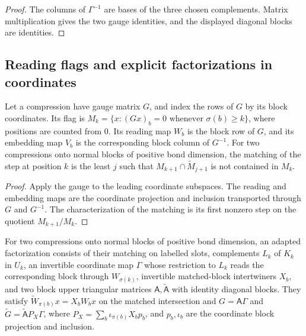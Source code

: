\begin{proof}
    \leanok
    The columns of $\Gamma^{-1}$ are bases of the three chosen complements.
    Matrix multiplication gives the two gauge identities, and the displayed
    diagonal blocks are identities.
\end{proof}

\subsection{Reading flags and explicit factorizations in coordinates}

\begin{lemma}
    \label{lem:asym_example_flag_coordinates}
    \leanok
    Let a compression have gauge matrix $G$, and index the rows of $G$ by
    its block coordinates. Its flag is
    $M_k=\{x:(Gx)_b=0\text{ whenever }\sigma(b)\geq k\}$, where positions
    are counted from $0$. Its reading map $W_b$ is the block row of $G$,
    and its embedding map $V_b$ is the corresponding block column of $G^{-1}$.
    For two compressions onto normal blocks of positive bond dimension,
    the matching of the step at position $k$ is the least $j$ such that
    $M_{k+1}\cap\widetilde M_{j+1}$ is not contained in $M_k$.
\end{lemma}

\begin{proof}
    \leanok
    Apply the gauge to the leading coordinate subspaces. The reading and
    embedding maps are the coordinate projection and inclusion transported
    through $G$ and $G^{-1}$. The characterization of the matching is its
    first nonzero step on the quotient $M_{k+1}/M_k$.
\end{proof}

\begin{definition}
    \label{def:asym_example_adapted_factorization}
    \leanok
    For two compressions onto normal blocks of positive bond dimension,
    an adapted factorization consists of their matching on labelled slots,
    complements $L_k$ of $K_k$ in $U_k$, an invertible coordinate map
    $\Gamma$ whose restriction to $L_k$ reads the corresponding block through
    $W_{\sigma(k)}$, invertible matched-block intertwiners $X_b$, and two
    block upper triangular matrices $\mathsf A,\widetilde{\mathsf A}$ with
    identity diagonal blocks. They satisfy
    $\widetilde W_{\pi(b)}x=X_bW_bx$ on the matched intersection and
    $G=\mathsf A\Gamma$ and
    $\widetilde G=\widetilde{\mathsf A}P_X\Gamma$, where
    $P_X=\sum_b\iota_{\pi(b)}X_bp_b$, and $p_b,\iota_b$ are the coordinate
    block projection and inclusion.
\end{definition}
